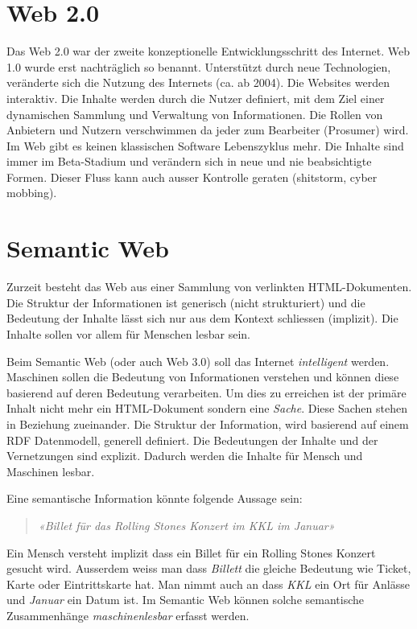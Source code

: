 \section{Web 2.0}

Das Web 2.0 war der zweite konzeptionelle Entwicklungsschritt des Internet. Web 1.0 wurde erst nachträglich so benannt. Unterstützt durch neue Technologien, veränderte sich die Nutzung des Internets (ca. ab 2004). Die Websites werden interaktiv. Die Inhalte werden durch die Nutzer definiert, mit dem Ziel einer dynamischen Sammlung und Verwaltung von Informationen. Die Rollen von Anbietern und Nutzern verschwimmen da jeder zum Bearbeiter (Prosumer) wird. Im Web gibt es keinen klassischen Software Lebenszyklus mehr. Die Inhalte sind immer im Beta-Stadium und verändern sich in neue und nie beabsichtigte Formen. Dieser Fluss kann auch ausser Kontrolle geraten (shitstorm, cyber mobbing).

\section{Semantic Web}

Zurzeit besteht das Web aus einer Sammlung von verlinkten HTML-Dokumenten. Die Struktur der Informationen ist generisch (nicht strukturiert) und die Bedeutung der Inhalte lässt sich nur aus dem Kontext schliessen (implizit). Die Inhalte sollen vor allem für Menschen lesbar sein.

Beim Semantic Web (oder auch Web 3.0) soll das Internet \textit{intelligent} werden. Maschinen sollen die Bedeutung von Informationen verstehen und können diese basierend auf deren Bedeutung verarbeiten. Um dies zu erreichen ist der primäre Inhalt nicht mehr ein HTML-Dokument sondern eine \textit{Sache}. Diese Sachen stehen in Beziehung zueinander. Die Struktur der Information, wird basierend auf einem RDF Datenmodell, generell definiert. Die Bedeutungen der Inhalte und der Vernetzungen sind explizit. Dadurch werden die Inhalte für Mensch und Maschinen lesbar.

Eine semantische Information könnte folgende Aussage sein:
\begin{quote}
	\textit{«Billet für das Rolling Stones Konzert im KKL im Januar»}
\end{quote}
Ein Mensch versteht implizit dass ein Billet für ein Rolling Stones Konzert gesucht wird. Ausserdem weiss man dass \textit{Billett} die gleiche Bedeutung wie Ticket, Karte oder Eintrittskarte hat. Man nimmt auch an dass \textit{KKL} ein Ort für Anlässe und \textit{Januar} ein Datum ist. Im Semantic Web können solche semantische Zusammenhänge \textit{maschinenlesbar} erfasst werden.

